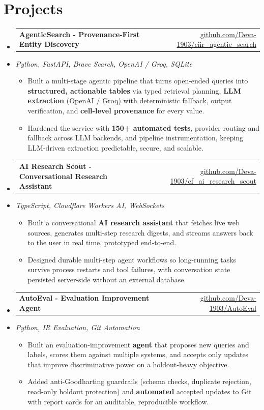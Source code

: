 \documentclass[letterpaper,10pt]{article}
\makeatletter
\newcommand{\resumeItem}[1]{
  \item\small{#1\vspace{-1pt}}
}
\newcommand{\resumeProjectHeading}[2]{
    \item
    \begin{tabular*}{0.985\textwidth}[t]{l@{\extracolsep{\fill}}r}
      \small\textbf{#1} & \small #2 \\
    \end{tabular*}\vspace{-5pt}
}
\newcommand{\resumeProjectSubheading}[1]{
  \vspace{-2pt}\item[] {\small\textcolor{ResumeSlate}{\emph{#1}}}\vspace{-3pt}
}
\newcommand{\resumeSubHeadingListStart}{\begin{itemize}[leftmargin=0.0in, label={}, itemsep=2pt, topsep=2pt]}
\newcommand{\resumeSubHeadingListEnd}{\end{itemize}}
\newcommand{\resumeItemListStart}{\begin{itemize}[leftmargin=0.18in, itemsep=2pt, topsep=1pt]}
\newcommand{\resumeItemListEnd}{\end{itemize}\vspace{-4pt}}
\makeatother
\begin{document}
\section{Projects}
\resumeSubHeadingListStart
  \resumeProjectHeading
    {AgenticSearch - Provenance-First Entity Discovery}
    {\href{https://github.com/Deva-1903/ciir_agentic_search}{github.com/Deva-1903/ciir\_agentic\_search}}
  \resumeProjectSubheading{Python, FastAPI, Brave Search, OpenAI / Groq, SQLite}
    \resumeItemListStart
      \resumeItem{Built a multi-stage agentic pipeline that turns open-ended queries into \textbf{structured, actionable tables} via typed retrieval planning, \textbf{LLM extraction} (OpenAI / Groq) with deterministic fallback, output verification, and \textbf{cell-level provenance} for every value.}
      \resumeItem{Hardened the service with \textbf{150+ automated tests}, provider routing and fallback across LLM backends, and pipeline instrumentation, keeping LLM-driven extraction predictable, secure, and scalable.}
    \resumeItemListEnd
  \resumeProjectHeading
    {AI Research Scout - Conversational Research Assistant}
    {\href{https://github.com/Deva-1903/cf_ai_research_scout}{github.com/Deva-1903/cf\_ai\_research\_scout}}
  \resumeProjectSubheading{TypeScript, Cloudflare Workers AI, WebSockets}
    \resumeItemListStart
      \resumeItem{Built a conversational \textbf{AI research assistant} that fetches live web sources, generates multi-step research digests, and streams answers back to the user in real time, prototyped end-to-end.}
      \resumeItem{Designed durable multi-step agent workflows so long-running tasks survive process restarts and tool failures, with conversation state persisted server-side without an external database.}
    \resumeItemListEnd
  \resumeProjectHeading
    {AutoEval - Evaluation Improvement Agent}
    {\href{https://github.com/Deva-1903/AutoEval}{github.com/Deva-1903/AutoEval}}
  \resumeProjectSubheading{Python, IR Evaluation, Git Automation}
    \resumeItemListStart
      \resumeItem{Built an evaluation-improvement \textbf{agent} that proposes new queries and labels, scores them against multiple systems, and accepts only updates that improve discriminative power on a holdout-heavy objective.}
      \resumeItem{Added anti-Goodharting guardrails (schema checks, duplicate rejection, read-only holdout protection) and \textbf{automated} accepted updates to Git with report cards for an auditable, reproducible workflow.}
    \resumeItemListEnd
\resumeSubHeadingListEnd
\vspace{-4pt}
\end{document}

